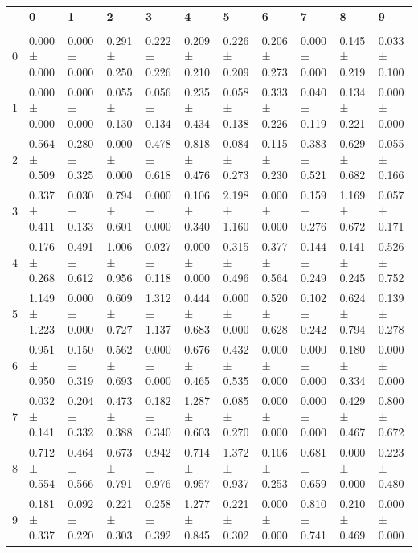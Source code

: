 \begingroup
\scriptsize
\setlength{\tabcolsep}{3pt}
\begin{tabular}{lllllllllll}
\toprule
 & \textbf{0} & \textbf{1} & \textbf{2} & \textbf{3} & \textbf{4} & \textbf{5} & \textbf{6} & \textbf{7} & \textbf{8} & \textbf{9} \\
  &  &  &  &  &  &  &  &  &  &  \\
\midrule
0 & 0.000 ± 0.000 & 0.000 ± 0.000 & 0.291 ± 0.250 & 0.222 ± 0.226 & 0.209 ± 0.210 & 0.226 ± 0.209 & 0.206 ± 0.273 & 0.000 ± 0.000 & 0.145 ± 0.219 & 0.033 ± 0.100 \\
1 & 0.000 ± 0.000 & 0.000 ± 0.000 & 0.055 ± 0.130 & 0.056 ± 0.134 & 0.235 ± 0.434 & 0.058 ± 0.138 & 0.333 ± 0.226 & 0.040 ± 0.119 & 0.134 ± 0.221 & 0.000 ± 0.000 \\
2 & 0.564 ± 0.509 & 0.280 ± 0.325 & 0.000 ± 0.000 & 0.478 ± 0.618 & 0.818 ± 0.476 & 0.084 ± 0.273 & 0.115 ± 0.230 & 0.383 ± 0.521 & 0.629 ± 0.682 & 0.055 ± 0.166 \\
3 & 0.337 ± 0.411 & 0.030 ± 0.133 & 0.794 ± 0.601 & 0.000 ± 0.000 & 0.106 ± 0.340 & 2.198 ± 1.160 & 0.000 ± 0.000 & 0.159 ± 0.276 & 1.169 ± 0.672 & 0.057 ± 0.171 \\
4 & 0.176 ± 0.268 & 0.491 ± 0.612 & 1.006 ± 0.956 & 0.027 ± 0.118 & 0.000 ± 0.000 & 0.315 ± 0.496 & 0.377 ± 0.564 & 0.144 ± 0.249 & 0.141 ± 0.245 & 0.526 ± 0.752 \\
5 & 1.149 ± 1.223 & 0.000 ± 0.000 & 0.609 ± 0.727 & 1.312 ± 1.137 & 0.444 ± 0.683 & 0.000 ± 0.000 & 0.520 ± 0.628 & 0.102 ± 0.242 & 0.624 ± 0.794 & 0.139 ± 0.278 \\
6 & 0.951 ± 0.950 & 0.150 ± 0.319 & 0.562 ± 0.693 & 0.000 ± 0.000 & 0.676 ± 0.465 & 0.432 ± 0.535 & 0.000 ± 0.000 & 0.000 ± 0.000 & 0.180 ± 0.334 & 0.000 ± 0.000 \\
7 & 0.032 ± 0.141 & 0.204 ± 0.332 & 0.473 ± 0.388 & 0.182 ± 0.340 & 1.287 ± 0.603 & 0.085 ± 0.270 & 0.000 ± 0.000 & 0.000 ± 0.000 & 0.429 ± 0.467 & 0.800 ± 0.672 \\
8 & 0.712 ± 0.554 & 0.464 ± 0.566 & 0.673 ± 0.791 & 0.942 ± 0.976 & 0.714 ± 0.957 & 1.372 ± 0.937 & 0.106 ± 0.253 & 0.681 ± 0.659 & 0.000 ± 0.000 & 0.223 ± 0.480 \\
9 & 0.181 ± 0.337 & 0.092 ± 0.220 & 0.221 ± 0.303 & 0.258 ± 0.392 & 1.277 ± 0.845 & 0.221 ± 0.302 & 0.000 ± 0.000 & 0.810 ± 0.741 & 0.210 ± 0.469 & 0.000 ± 0.000 \\
\bottomrule
\end{tabular}

\endgroup
